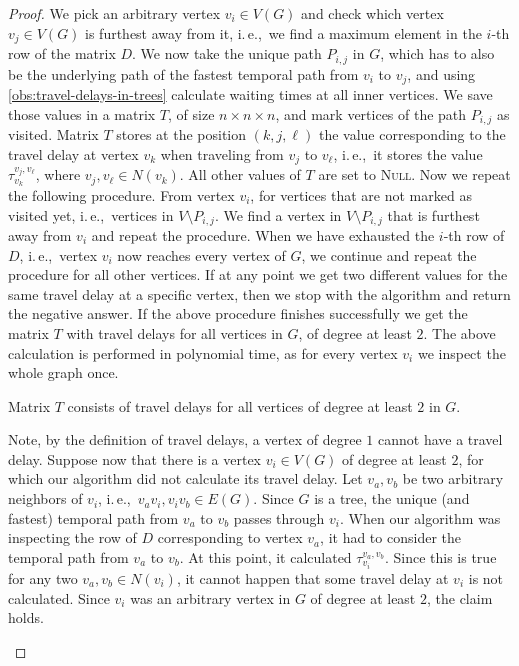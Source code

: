 \documentclass[a4paper,UKenglish,cleveref, autoref, thm-restate, anonymous]{lipics-v2021}
\newcommand{\ie}{i.\,e.,\ }
\begin{document}
\begin{proof}
    We pick an arbitrary vertex $v_i \in V(G)$ and check which vertex $v_j \in V(G)$ is furthest away from it, \ie we find a maximum element in the $i$-th row of the matrix $D$.
    We now take the unique path $P_{i,j}$ in $G$, 
    which has to also be the underlying path of the fastest temporal path from $v_i$ to $v_j$, and using \cref{obs:travel-delays-in-trees} calculate waiting times at all inner vertices.
    We save those values in a matrix $T$, of size $n \times n \times n$, and mark vertices of the path  $P_{i,j}$ as visited.
    Matrix $T$ stores at the position $(k,j,\ell)$ the value corresponding to the travel delay at vertex $v_k$ when traveling from $v_{j}$ to $v_{\ell}$, 
    \ie it stores the value $\tau_{v_k}^{v_{j}, v_\ell}$, where $v_j,v_\ell \in N(v_k)$. All other values of $T$ are set to \textsc{Null}.
    Now we repeat the following procedure. From vertex $v_i$, for vertices that are not marked as visited yet, \ie vertices in $V \setminus P_{i,j}$.
    We find a vertex in $V \setminus P_{i,j}$ that is furthest away from $v_i$ and repeat the procedure.
    When we have exhausted the $i$-th row of $D$,
    \ie vertex $v_i$ now reaches every vertex of $G$,
    we continue and repeat the procedure for all other vertices.
    If at any point we get two different values for the same travel delay at a specific vertex, then we stop with the algorithm and return the negative answer.
    If the above procedure finishes successfully we get the matrix $T$ with travel delays for all vertices in $G$, of degree at least $2$.
    The above calculation is performed in polynomial time, as for every vertex $v_i$ we inspect the whole graph once.
    \begin{claim}\label{lemma:matrixT-travelDelays-tree}
        Matrix $T$ consists of travel delays for all vertices of degree at least $2$ in $G$.
    \end{claim}
    \begin{claimproof}
        Note, by the definition of travel delays, a vertex of degree $1$ cannot have a travel delay.
        Suppose now that there is a vertex $v_i \in V(G)$ of degree at least $2$, for which our algorithm did not calculate its travel delay.
        Let $v_a, v_b$ be two arbitrary neighbors of $v_i$, \ie $v_a v_i, v_i v_b \in E(G)$.
        Since $G$ is a tree, the unique (and fastest) temporal path from $v_a$ to $v_b$ passes through $v_i$.
        When our algorithm was inspecting the row of $D$ corresponding to vertex $v_a$, it had to consider the temporal path from $v_a$ to $v_b$. 
        At this point, it calculated $\tau_{v_i}^{v_a,v_b}$. 
        Since this is true for any two $v_a, v_b \in N(v_i)$, it cannot happen that some travel delay at $v_i$ is not calculated.
        Since $v_i$ was an arbitrary vertex in $G$ of degree at least $2$, the claim holds.
    \end{claimproof}
    

\end{proof}
\end{document}
